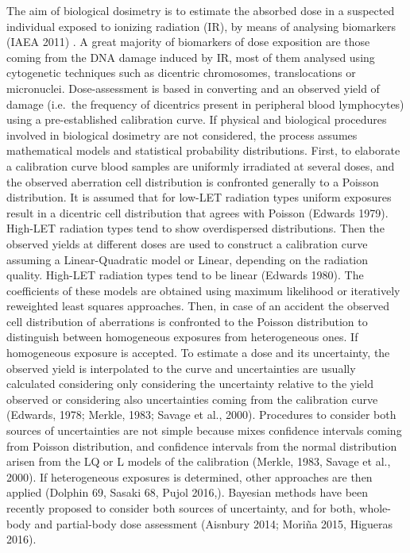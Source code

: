 \documentclass[]{scrartcl}
\begin{document}
The aim of biological dosimetry is to estimate the absorbed dose in a suspected individual exposed to ionizing radiation (IR), by means of analysing biomarkers (IAEA 2011) \citep{IAEA2011}. A great majority of biomarkers of dose exposition are those coming from the DNA damage induced by IR, most of them analysed using cytogenetic techniques such as dicentric chromosomes, translocations or micronuclei. Dose-assessment is based in converting and an observed yield of damage (i.e.~the frequency of dicentrics present in peripheral blood lymphocytes) using a pre-established calibration curve. If physical and biological procedures involved in biological dosimetry are not considered, the process assumes mathematical models and statistical probability distributions. First, to elaborate a calibration curve blood samples are uniformly irradiated at several doses, and the observed aberration cell distribution is confronted generally to a Poisson distribution. It is assumed that for low-LET radiation types uniform exposures result in a dicentric cell distribution that agrees with Poisson (Edwards 1979). High-LET radiation types tend to show overdispersed distributions. Then the observed yields at different doses are used to construct a calibration curve assuming a Linear-Quadratic model or Linear, depending on the radiation quality. High-LET radiation types tend to be linear (Edwards 1980). The coefficients of these models are obtained using maximum likelihood or iteratively reweighted least squares approaches. Then, in case of an accident the observed cell distribution of aberrations is confronted to the Poisson distribution to distinguish between homogeneous exposures from heterogeneous ones. If homogeneous exposure is accepted. To estimate a dose and its uncertainty, the observed yield is interpolated to the curve and uncertainties are usually calculated considering only considering the uncertainty relative to the yield observed or considering also uncertainties coming from the calibration curve (Edwards, 1978; Merkle, 1983; Savage et al., 2000). Procedures to consider both sources of uncertainties are not simple because mixes confidence intervals coming from Poisson distribution, and confidence intervals from the normal distribution arisen from the LQ or L models of the calibration (Merkle, 1983, Savage et al., 2000). If heterogeneous exposures is determined, other approaches are then applied (Dolphin 69, Sasaki 68, Pujol 2016,). Bayesian methods have been recently proposed to consider both sources of uncertainty, and for both, whole-body and partial-body dose assessment (Aisnbury 2014; Moriña 2015, Higueras 2016).
\end{document}
